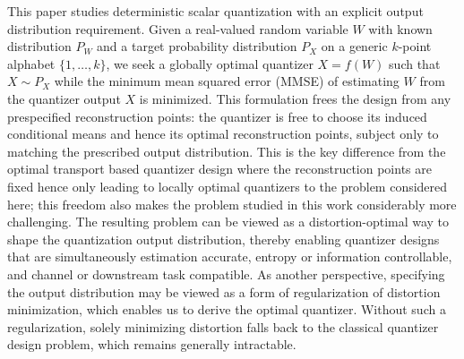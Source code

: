 \documentclass[conference]{IEEEtran}
\begin{document}
This paper studies deterministic scalar quantization with an explicit output distribution requirement. Given a real-valued random variable $W$ with known distribution $P_W$ and a target probability distribution $P_X$ on a generic $k$-point alphabet $\{1, \ldots,k\}$, we seek a globally optimal quantizer $X=f(W)$ such that $X\sim P_X$ while the minimum mean squared error (MMSE) of estimating $W$ from the quantizer output $X$ is minimized. This formulation frees the design from any prespecified reconstruction points: the quantizer is free to choose its induced conditional means and hence its optimal reconstruction points, subject only to matching the prescribed output distribution. 
This is the key difference from the optimal transport based quantizer design where the reconstruction points are fixed \cite{power_cell_cluster} hence only leading to locally optimal quantizers to the problem considered here; this freedom also makes the problem studied in this work considerably more challenging.
The resulting problem can be viewed as a distortion-optimal way to shape the quantization output distribution, thereby enabling quantizer designs that are simultaneously estimation accurate, entropy or information controllable, and channel or downstream task compatible.
As another perspective, specifying the output distribution may be viewed as a form of regularization of distortion minimization, which enables us to derive the optimal quantizer. Without such a regularization, solely minimizing distortion falls back to the classical quantizer design problem, which remains generally intractable.

\end{document}
